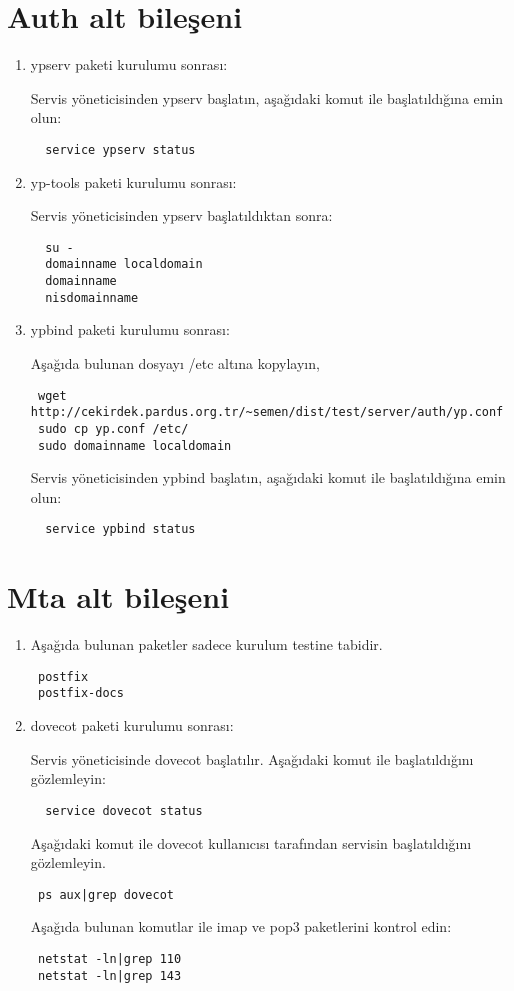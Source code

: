 \documentclass[a4paper,10pt]{article}
\begin{document}
\section{Auth alt bileşeni}
\begin{enumerate}
 \item ypserv paketi kurulumu sonrası:

Servis yöneticisinden ypserv başlatın, aşağıdaki komut ile başlatıldığına emin olun:
\begin{verbatim}
  service ypserv status
\end{verbatim}

\item yp-tools paketi kurulumu sonrası:

Servis yöneticisinden ypserv başlatıldıktan sonra:
\begin{verbatim}
  su -
  domainname localdomain
  domainname
  nisdomainname
\end{verbatim}

\item ypbind paketi kurulumu sonrası:

Aşağıda bulunan dosyayı /etc altına kopylayın,
\begin{verbatim}
 wget http://cekirdek.pardus.org.tr/~semen/dist/test/server/auth/yp.conf 
 sudo cp yp.conf /etc/
 sudo domainname localdomain
\end{verbatim}

Servis yöneticisinden ypbind başlatın, aşağıdaki komut ile başlatıldığına emin olun:
\begin{verbatim}
  service ypbind status
\end{verbatim}

\end{enumerate}

\section{Mta alt bileşeni}
\begin{enumerate}
\item Aşağıda bulunan paketler sadece kurulum testine tabidir.

\begin{verbatim}
 postfix
 postfix-docs
\end{verbatim}

 \item dovecot paketi kurulumu sonrası:

Servis yöneticisinde dovecot başlatılır.
Aşağıdaki komut ile başlatıldığını gözlemleyin:
\begin{verbatim}
  service dovecot status
\end{verbatim}
Aşağıdaki komut ile dovecot kullanıcısı tarafından servisin başlatıldığını gözlemleyin.
\begin{verbatim}
 ps aux|grep dovecot 
\end{verbatim}

Aşağıda bulunan komutlar ile imap ve pop3 paketlerini kontrol edin:
\begin{verbatim}
 netstat -ln|grep 110
 netstat -ln|grep 143
\end{verbatim}

\end{enumerate}
\end{document}
